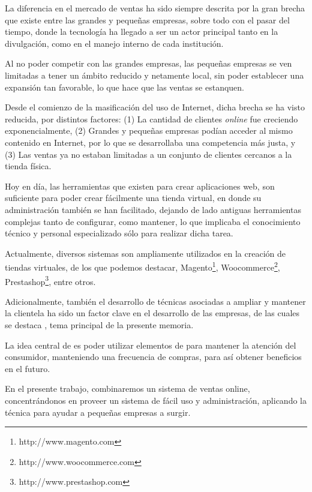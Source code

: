 La diferencia en el mercado de ventas ha sido siempre descrita por la gran
brecha que existe entre las grandes y pequeñas empresas, sobre todo con el
pasar del tiempo, donde la tecnología ha llegado a ser un actor principal
tanto en la divulgación, como en el manejo interno de cada institución.

Al no poder competir con las grandes empresas, las pequeñas empresas se ven
limitadas a tener un ámbito reducido y netamente local, sin poder establecer
una expansión tan favorable, lo que hace que las ventas se estanquen.

Desde el comienzo de la masificación del uso de Internet, dicha brecha se ha
visto reducida, por distintos factores: (1) La cantidad de clientes \emph{online}
fue creciendo exponencialmente, (2) Grandes y pequeñas empresas podían acceder
al mismo contenido en Internet, por lo que se desarrollaba una competencia
más justa, y (3) Las ventas ya no estaban limitadas a un conjunto de clientes
cercanos a la tienda física.

Hoy en día, las herramientas que existen para crear aplicaciones web, son suficiente
para poder crear fácilmente una tienda virtual, en donde su administración
también se han facilitado, dejando de lado antiguas herramientas complejas
tanto de configurar, como mantener, lo que implicaba el conocimiento técnico
y personal especializado sólo para realizar dicha tarea.

Actualmente, diversos sistemas son ampliamente utilizados en la creación
de tiendas virtuales, de los que podemos destacar,
Magento\footnote{http://www.magento.com},
Woocommerce\footnote{http://www.woocommerce.com},
Prestashop\footnote{http://www.prestashop.com},
entre otros.

Adicionalmente, también el desarrollo de técnicas asociadas a ampliar y mantener
la clientela ha sido un factor clave en el desarrollo de las empresas,
de las cuales se destaca {\GAM}, tema principal de la presente memoria.

La idea central de  {\GAM} es poder utilizar elementos de 
para mantener la atención del consumidor, manteniendo una frecuencia de compras,
para así obtener beneficios en el futuro.

En el presente trabajo, combinaremos un sistema de ventas online, concentrándonos
en proveer un sistema de fácil uso y administración, aplicando la técnica {\GAM}
para ayudar a pequeñas empresas a surgir.

